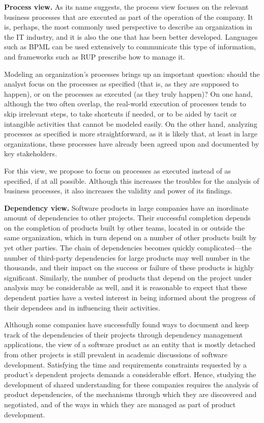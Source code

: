 \textbf{Process view.} As its name suggests, the process view focuses on the relevant business processes that are executed as part of the operation of the company. It is, perhaps, the most commonly used perspective to describe an organization in the IT industry, and it is also the one that has been better developed. Languages such as BPML can be used extensively to communicate this type of information, and frameworks such as RUP prescribe how to manage it.

Modeling an organization's processes brings up an important question: should the analyst focus on the processes as specified (that is, as they are supposed to happen), or on the processes as executed (as they truly happen)? On one hand, although the two often overlap, the real-world execution of processes tends to skip irrelevant steps, to take shortcuts if needed, or to be aided by tacit or intangible activities that cannot be modeled easily. On the other hand, analyzing processes as specified is more straightforward, as it is likely that, at least in large organizations, these processes have already been agreed upon and documented by key stakeholders.

For this view, we propose to focus on processes as executed instead of as specified, if at all possible. Although this increases the troubles for the analysis of business processes, it also increases the validity and power of its findings.

\textbf{Dependency view.} Software products in large companies have an inordinate amount of dependencies to other projects. Their successful completion depends on the completion of products built by other teams, located in or outside the same organization, which in turn depend on a number of other products built by yet other parties. The chain of dependencies becomes quickly complicated---the number of third-party dependencies for large products may well number in the thousands, and their impact on the success or failure of these products is highly significant. Similarly, the number of products that depend on the project under analysis may be considerable as well, and it is reasonable to expect that these dependent parties have a vested interest in being informed about the progress of their dependees and in influencing their activities.

Although some companies have successfully found ways to document and keep track of the dependencies of their projects through dependency management applications, the view of a software product as an entity that is mostly detached from other projects is still prevalent in academic discussions of software development. Satisfying the time and requirements constraints requested by a product's dependent projects demands a considerable effort. Hence, studying the development of shared understanding for these companies requires the analysis of product dependencies, of the mechanisms through which they are discovered and negotiated, and of the ways in which they are managed as part of product development.

